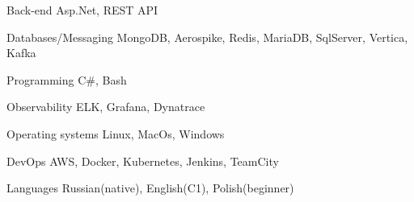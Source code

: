 

\begin{cvskills}

  \cvskill
    {Back-end} %
    {Asp.Net, REST API} %

  \cvskill
    {Databases/Messaging} %
    {MongoDB, Aerospike, Redis, MariaDB, SqlServer, Vertica, Kafka} %

  \cvskill
    {Programming} %
    {C\#, Bash} %

  \cvskill
    {Observability} %
    {ELK, Grafana, Dynatrace} %

  \cvskill
    {Operating systems} %
    {Linux, MacOs, Windows} %

  \cvskill
    {DevOps} %
    {AWS, Docker, Kubernetes, Jenkins, TeamCity} %

  \cvskill
    {Languages} %
    {Russian(native), English(C1), Polish(beginner)} %

\end{cvskills}
